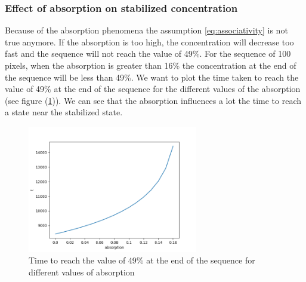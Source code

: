 \subsubsection{Effect of absorption on stabilized concentration}

Because of the absorption phenomena the assumption \eqref{eq:associativity} is not true 
anymore. If the absorption is too high, the concentration will decrease too fast and the 
sequence will not reach the value of 49\%. For the sequence of 100 pixels, when the 
absorption is greater than 16\% the concentration at the end of the sequence will be less 
than 49\%. We want to plot the time taken to reach the value of 49\% at the end of the 
sequence for the different values of the absorption (see figure (\ref{fig:absorb})). We 
can see that the absorption influences a lot the time to reach a state near the stabilized 
state.

\begin{figure}[h]
    \center
    \includegraphics[width=0.66\textwidth]{figures/absorption.png}
    \caption{Time to reach the value of 49\% at the end of the sequence for different values of absorption}
    \label{fig:absorb}
\end{figure}
